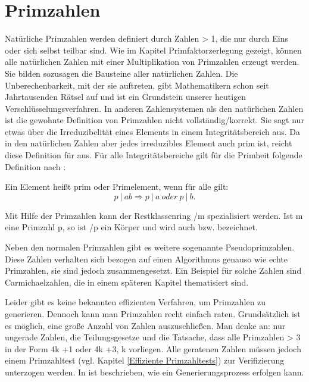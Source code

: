\section{Primzahlen}\label{Kapitel Primzahlen}
	Natürliche Primzahlen werden definiert durch Zahlen > 1, die nur durch Eins oder sich selbst teilbar sind. Wie im Kapitel Primfaktorzerlegung gezeigt, können alle natürlichen Zahlen mit einer Multiplikation von Primzahlen erzeugt werden. Sie bilden sozusagen die Bausteine aller natürlichen Zahlen. Die Unberechenbarkeit, mit der sie auftreten, gibt Mathematikern schon seit Jahrtausenden Rätsel auf und ist ein Grundstein unserer heutigen Verschlüsselungsverfahren.
	In anderen Zahlensystemen als den natürlichen Zahlen ist die gewohnte Definition von Primzahlen nicht vollständig/korrekt. Sie sagt nur etwas über die Irreduzibelität eines Elements in einem Integritätsbereich aus. Da in den natürlichen Zahlen aber jedes irreduzibles Element auch prim ist, reicht diese Definition für  aus.
	Für alle Integritätsbereiche gilt für die Primheit folgende Definition nach \cite{Algorithmische:Zahlentheorie}:
	
	Ein Element  heißt prim oder Primelement, wenn für alle  gilt:	
	\begin{displaymath}
		p~|~ab \Longrightarrow p~|~a~oder~p~|~b.
	\end{displaymath}
		
	Mit Hilfe der Primzahlen kann der Restklassenring /m spezialisiert werden. Ist m eine Primzahl p, so ist /p ein Körper und wird auch  bzw.  bezeichnet.
	
	Neben den normalen Primzahlen gibt es weitere sogenannte Pseudoprimzahlen. Diese Zahlen verhalten sich bezogen auf einen Algorithmus genauso wie echte Primzahlen, sie sind jedoch zusammengesetzt. Ein Beispiel für solche Zahlen sind Carmichaelzahlen, die in einem späteren Kapitel thematisiert sind.

	Leider gibt es keine bekannten effizienten Verfahren, um Primzahlen zu generieren. Dennoch kann man Primzahlen recht einfach raten. Grundsätzlich ist es möglich, eine große Anzahl von Zahlen auszuschließen. Man denke an: nur ungerade Zahlen, die Teilungsgesetze und die Tatsache, dass alle Primzahlen > 3 in der Form 4k +1 oder 4k +3, k \myin {} vorliegen. Alle geratenen Zahlen müssen jedoch einem Primzahltest (vgl. Kapitel \ref{Effiziente Primzahltests}) zur Verifizierung unterzogen werden. In \cite{Algebraische:und:zahlentheoretische:Grundlagen:fuer:die:Informatik} ist beschrieben, wie ein Generierungsprozess erfolgen kann.

